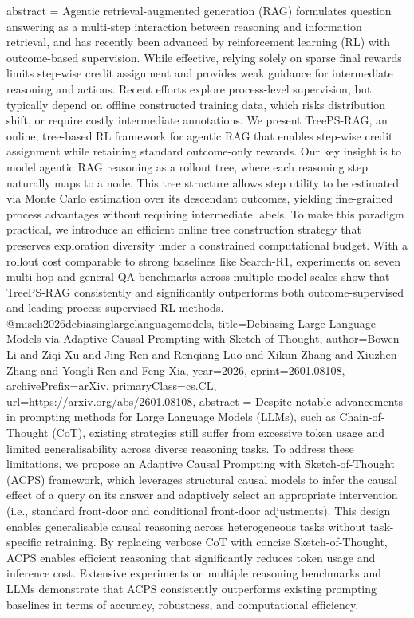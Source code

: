 {      abstract = {Agentic retrieval-augmented generation (RAG) formulates question answering as a multi-step interaction between reasoning and information retrieval, and has recently been advanced by reinforcement learning (RL) with outcome-based supervision. While effective, relying solely on sparse final rewards limits step-wise credit assignment and provides weak guidance for intermediate reasoning and actions. Recent efforts explore process-level supervision, but typically depend on offline constructed training data, which risks distribution shift, or require costly intermediate annotations. We present TreePS-RAG, an online, tree-based RL framework for agentic RAG that enables step-wise credit assignment while retaining standard outcome-only rewards. Our key insight is to model agentic RAG reasoning as a rollout tree, where each reasoning step naturally maps to a node. This tree structure allows step utility to be estimated via Monte Carlo estimation over its descendant outcomes, yielding fine-grained process advantages without requiring intermediate labels. To make this paradigm practical, we introduce an efficient online tree construction strategy that preserves exploration diversity under a constrained computational budget. With a rollout cost comparable to strong baselines like Search-R1, experiments on seven multi-hop and general QA benchmarks across multiple model scales show that TreePS-RAG consistently and significantly outperforms both outcome-supervised and leading process-supervised RL methods.}
}@misc{li2026debiasinglargelanguagemodels,
      title={Debiasing Large Language Models via Adaptive Causal Prompting with Sketch-of-Thought}, 
      author={Bowen Li and Ziqi Xu and Jing Ren and Renqiang Luo and Xikun Zhang and Xiuzhen Zhang and Yongli Ren and Feng Xia},
      year={2026},
      eprint={2601.08108},
      archivePrefix={arXiv},
      primaryClass={cs.CL},
      url={https://arxiv.org/abs/2601.08108},
      abstract = {Despite notable advancements in prompting methods for Large Language Models (LLMs), such as Chain-of-Thought (CoT), existing strategies still suffer from excessive token usage and limited generalisability across diverse reasoning tasks. To address these limitations, we propose an Adaptive Causal Prompting with Sketch-of-Thought (ACPS) framework, which leverages structural causal models to infer the causal effect of a query on its answer and adaptively select an appropriate intervention (i.e., standard front-door and conditional front-door adjustments). This design enables generalisable causal reasoning across heterogeneous tasks without task-specific retraining. By replacing verbose CoT with concise Sketch-of-Thought, ACPS enables efficient reasoning that significantly reduces token usage and inference cost. Extensive experiments on multiple reasoning benchmarks and LLMs demonstrate that ACPS consistently outperforms existing prompting baselines in terms of accuracy, robustness, and computational efficiency.}
}
